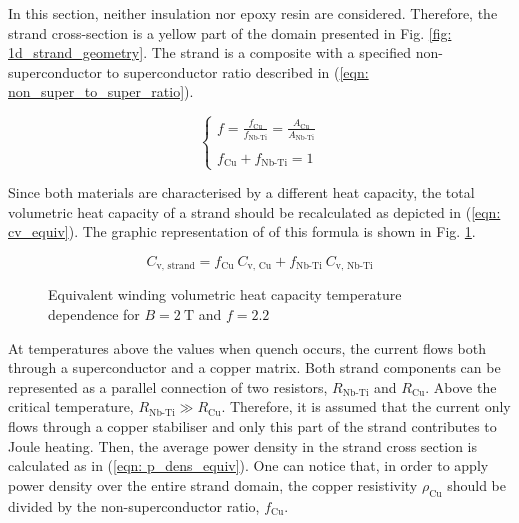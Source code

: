 
In this section, neither insulation nor epoxy resin are considered. Therefore, the strand cross-section is a yellow part of the domain presented in Fig. \ref{fig: 1d_strand_geometry}. The strand is a composite with a specified non-superconductor to superconductor ratio described in (\ref{eqn: non_super_to_super_ratio}).

\begin{equation}
    \left\{ \begin{array}{ll}
    f = \frac{f_\text{Cu}}{f_\text{Nb-Ti}} = \frac{A_\text{Cu}}{A_\text{Nb-Ti}}\\ \\
    f_\text{Cu} + f_\text{Nb-Ti} = 1
    \end{array} \right.
    \label{eqn: non_super_to_super_ratio}
\end{equation}

Since both materials are characterised by a different heat capacity, the total volumetric heat capacity of a strand should be recalculated as depicted in (\ref{eqn: cv_equiv}). The graphic representation of of this formula is shown in Fig. \ref{fig:eq_wind_cp}.

\begin{equation}
    C_\text{v, strand} = f_\text{Cu} ~ C_\text{v, Cu} + f_\text{Nb-Ti} ~ C_\text{v, Nb-Ti}
    \label{eqn: cv_equiv}
\end{equation}

\begin{figure}[h!]
\centering
    \caption{Equivalent winding volumetric heat capacity temperature dependence for $B=2~\text{T}$ and $f=2.2$}
    \label{fig:eq_wind_cp}
\end{figure}

At temperatures above the values when quench occurs, the current flows both through a superconductor and a copper matrix. Both strand components can be represented as a parallel connection of two resistors, $R_\text{Nb-Ti}$ and $R_\text{Cu}$. Above the critical temperature, $R_\text{Nb-Ti} \gg R_\text{Cu}$. Therefore, it is assumed that the current only flows through a copper stabiliser and only this part of the strand contributes to Joule heating. Then, the average power density in the strand cross section is calculated as in (\ref{eqn: p_dens_equiv}). One can notice that, in order to apply power density over the entire strand domain, the copper resistivity $\rho_\text{Cu}$ should be divided by the non-superconductor ratio, $f_\text{Cu}$.

